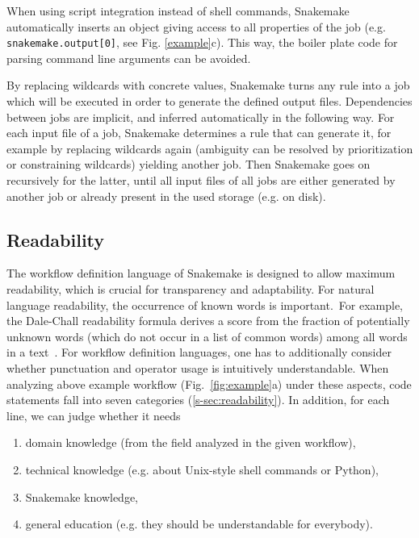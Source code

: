 \documentclass[parskip=half]{scrartcl}
\begin{document}
When using script integration instead of shell commands, Snakemake automatically inserts an object giving access to all properties of the job (e.g. \lstinline!snakemake.output[0]!, see Fig.
\ref{example}c).
This way, the boiler plate code for parsing command line arguments can be avoided.

By replacing wildcards with concrete values, Snakemake turns any rule into a job which will be executed in order to generate the defined output files.
Dependencies between jobs are implicit, and inferred automatically in the following way.
For each input file of a job, Snakemake determines a rule that can generate it, for example by replacing wildcards again (ambiguity can be resolved by prioritization or constraining wildcards) yielding another job.
Then Snakemake goes on recursively for the latter, until all input files of all jobs are either generated by another job or already present in the used storage (e.g. on disk).

\subsection{Readability}

The workflow definition language of Snakemake is designed to allow maximum readability, which is crucial for transparency and adaptability.
For natural language readability, the occurrence of known words is important.~For example, the Dale-Chall readability formula derives a score from the fraction of potentially unknown words (which do not occur in a list of common words) among all words in a text~\parencite{chall_readability_1995}.
For workflow definition languages, one has to additionally consider whether punctuation and operator usage is intuitively understandable.
When analyzing above example workflow (Fig.~\ref{fig:example}a) under these aspects, code statements fall into seven categories (\autoref{s-sec:readability}).
In addition, for each line, we can judge whether it needs 

\begin{enumerate}
	\item domain knowledge (from the field analyzed in the given workflow),
	\item technical knowledge (e.g. about Unix-style shell commands or Python),
	\item Snakemake knowledge,
	\item general education (e.g. they should be understandable for everybody).
\end{enumerate}
\end{document}
